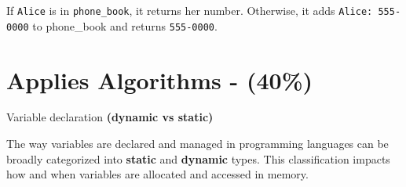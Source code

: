 \documentclass[
  letterpaper,
  DIV=11,
  numbers=noendperiod]{scrreprt}
\begin{document}
If \texttt{\textquotesingle{}Alice\textquotesingle{}} is in
\texttt{phone\_book}, it returns her number. Otherwise, it adds
\texttt{\textquotesingle{}Alice\textquotesingle{}:\ \textquotesingle{}555-0000\textquotesingle{}}
to phone\_book and returns
\texttt{\textquotesingle{}555-0000\textquotesingle{}}.

\section*{Applies Algorithms - (40\%)}\label{applies-algorithms---40}


Variable declaration \textbf{(dynamic vs static)}

The way variables are declared and managed in programming languages can
be broadly categorized into \textbf{static} and \textbf{dynamic} types.
This classification impacts how and when variables are allocated and
accessed in memory.
\end{document}
